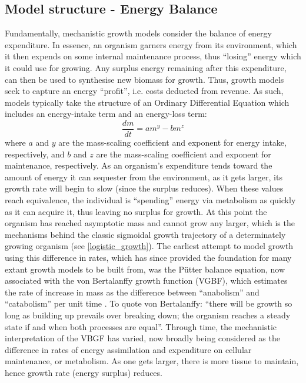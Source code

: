 \documentclass[a4paper]{article} %
\begin{document}
    \subsection{Model structure - Energy Balance}
        Fundamentally, mechanistic growth models consider the balance of energy expenditure. In essence, an organism garners energy from its environment, which it then expends on some internal maintenance process, thus ``losing'' energy which it could use for growing. Any surplus energy remaining after this expenditure, can then be used to synthesise new biomass for growth.  Thus, growth models seek to capture an energy ``profit'', i.e. costs deducted from revenue. As such, models typically take the structure of an Ordinary Differential Equation which includes an energy-intake term and an energy-loss term:
        \begin{equation}
            \frac{dm}{dt} = am^y - bm^z \label{difference_equation}
        \end{equation}        
        where $a$ and $y$ are the mass-scaling coefficient and exponent for energy intake, respectively, and $b$ and $z$ are the mass-scaling coefficient and exponent for maintenance, respectively. As an organism's expenditure tends toward the amount of energy it can sequester from the environment, as it gets larger, its growth rate will begin to slow (since the surplus reduces). When these values reach equivalence, the individual is ``spending'' energy via metabolism as quickly as it can acquire it, thus leaving no surplus for growth. At this point the organism has reached asymptotic mass and cannot grow any larger, which is the mechanisms behind the classic sigmoidal growth trajectory of a determinately growing organism (see \ref{logistic_growth}).  The earliest attempt to model growth using this difference in rates, which has since provided the foundation for many extant growth models to be built from, was the P\"{u}tter balance equation, now associated with the von Bertalanffy growth function (VGBF), which estimates the rate of increase in mass as the difference between ``anabolism'' and ``catabolism'' per unit time \autocite{Putter1920, vonBert1938, VonBertalanffy1957}. To quote von Bertalanffy: ``there will be growth so long as building up prevails over breaking down; the organism reaches a steady state if and when both processes are equal''. Through time, the mechanistic interpretation of the VBGF has varied, now broadly being considered as the difference in rates of energy assimilation and expenditure on cellular maintenance, or metabolism. As one gets larger, there is more tissue to maintain, hence growth rate (energy surplus) reduces.
        
\end{document}
